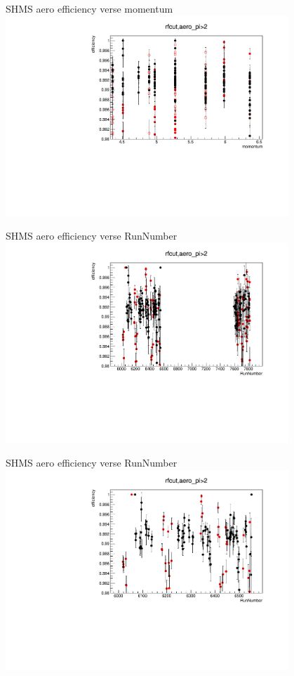 \documentclass[aspectratio=169,xcolor=dvipsnames]{beamer}
\begin{document}
\begin{frame}{SHMS aero efficiency verse momentum}
  \includegraphics[width = 0.8\textwidth]{results/pid/SHMS_aero_DE_momentum.pdf}
\end{frame}
\begin{frame}{SHMS aero efficiency verse RunNumber}
  \includegraphics[width = 0.8\textwidth]{results/pid/SHMS_aero_DE_RunNumber.pdf}
\end{frame}
\begin{frame}{SHMS aero efficiency verse RunNumber}
  \includegraphics[width = 0.8\textwidth]{results/pid/SHMS_aero_DE_RunNumber_fall.pdf}
\end{frame}
\end{document}
